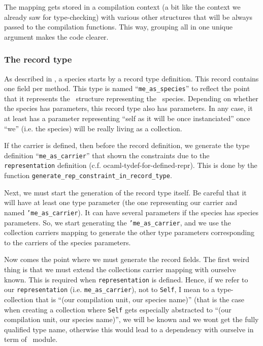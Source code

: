 \medskip
The mapping gets stored in a compilation context (a bit like the
context we already saw for type-checking) with various other
structures that will be always passed to the compilation
functions. This way, grouping all in one unique argument makes the
code clearer.

\subsubsection{The record type}
As described in \label{code-gen-model}, a species starts by a record
type definition. This record contains one field per method. This type
is named ``{\tt me\_as\_species}'' to reflect the point that it
represents the \ocaml\ structure representing the \focal\ species.
Depending on whether the species has parameters, this record type also
has parameters. In any case, it at least has a parameter representing
``self as it will be once instanciated'' once ``we'' (i.e. the
species) will be really living as a collection.

\medskip
If the carrier is defined, then before the record definition, we
generate the type definition ``{\tt me\_as\_carrier}'' that shown the
constraints due to the {\tt representation} definition
(c.f. {ocaml-tydef-for-defined-repr}). This is done by the function
{\tt generate\_rep\_constraint\_in\_record\_type}.

\medskip
Next, we must start the generation of the record type itself. Be
careful that it will have at least one type parameter (the one
representing our carrier and named {\tt 'me\_as\_carrier}). It can
have several parameters if the species has species parameters. So, we
start generating the {\tt 'me\_as\_carrier}, and we use the collection
carriers mapping to generate the other type parameters corresponding
to the carriers of the species parameters.

\medskip
Now comes the point where we must generate the record fields. The
first weird thing is that we must extend the collections carrier mapping
with ourselve known. This is required when {\tt representation} is defined. 
Hence, if we refer to our {\tt representation} (i.e.
{\tt me\_as\_carrier}), not to {\tt Self}, I mean to a type-collection
that is ``(our compilation unit, our species name)'' (that is the case
when creating a collection where {\tt Self} gets especially abstracted
to ``(our compilation unit, our species name)'', we  will be known and
we wont get the fully qualified type name, otherwise this would lead
to a dependency with ourselve in term of \ocaml\ module.

